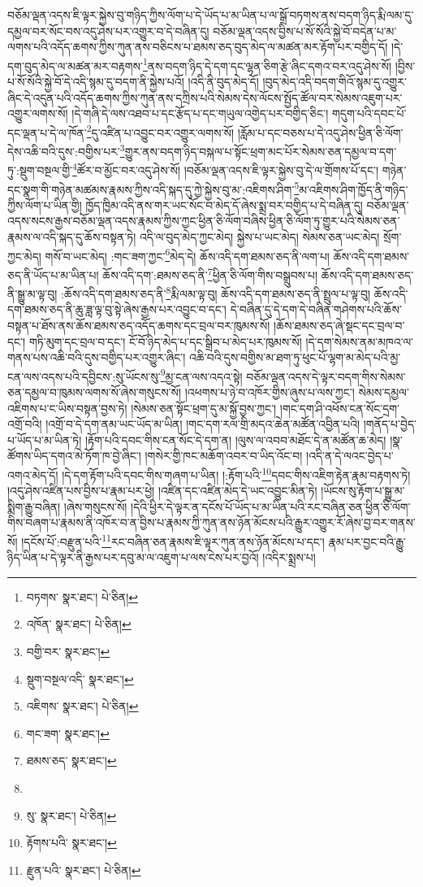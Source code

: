 བཅོམ་ལྡན་འདས་ཇི་ལྟར་སྐྱེས་བུ་གཉིད་ཀྱིས་ལོག་པ་དེ་ཡོད་པ་མ་ཡིན་པ་ལ་སྒྲོ་བཏགས་ནས་བདག་ཉིད་རྨི་ལམ་དུ་དམྱལ་བར་སོང་བས་འདུ་ཤེས་པར་འགྱུར་བ་དེ་བཞིན་དུ། བཅོམ་ལྡན་འདས་བྱིས་པ་སོ་སོའི་སྐྱེ་བོ་བདེན་པ་མ་ལགས་པའི་འདོད་ཆགས་ཀྱིས་ཀུན་ནས་བཅིངས་པ་ཐམས་ཅད་བུད་མེད་ལ་མཚན་མར་རྟོག་པར་བགྱིད་དོ། །དེ་དག་བུད་མེད་ལ་མཚན་མར་བརྟགས་\footnote{བཏགས་  སྣར་ཐང་།  པེ་ཅིན། }ནས་བདག་ཉིད་དེ་དག་དང་ལྷན་ཅིག་རྩེ་ཞིང་དགའ་བར་འདུ་ཤེས་སོ། །བྱིས་པ་སོ་སོའི་སྐྱེ་བོ་དེ་འདི་སྙམ་དུ་བདག་ནི་སྐྱེས་པའོ། །འདི་ནི་བུད་མེད་དོ། །བུད་མེད་འདི་བདག་གིའོ་སྙམ་དུ་འགྱུར་ཞིང་དེ་འདུན་པའི་འདོད་ཆགས་ཀྱིས་ཀུན་ནས་དཀྲིས་པའི་སེམས་དེས་ལོངས་སྤྱོད་ཚོལ་བར་སེམས་འཇུག་པར་འགྱུར་ལགས་སོ། །དེ་གཞི་དེ་ལས་འཐབ་པ་དང་རྩོད་པ་དང་གཡུལ་འགྱེད་པར་བགྱིད་ཅིང་། གདུག་པའི་དབང་པོ་དང་ལྡན་པ་དེ་ལ་ཁོན་\footnote{འཁོན་  སྣར་ཐང་།  པེ་ཅིན། }དུ་འཛིན་པ་འབྱུང་བར་འགྱུར་ལགས་སོ། །རློམ་པ་དང་བཅས་པ་དེ་འདུ་ཤེས་ཕྱིན་ཅི་ལོག་དེས་འཆི་བའི་དུས་:བགྱིས་པར་\footnote{བགྱི་བར་  སྣར་ཐང་། }གྱུར་ནས་བདག་ཉིད་བསྐལ་པ་སྟོང་ཕྲག་མང་པོར་སེམས་ཅན་དམྱལ་བ་དག་ཏུ་:སྡུག་བསྔལ་གྱི་\footnote{སྡུག་བསྔལ་འདི་  སྣར་ཐང་། }ཚོར་བ་མྱོང་བར་འདུ་ཤེས་སོ། །བཅོམ་ལྡན་འདས་ཇི་ལྟར་སྐྱེས་བུ་དེ་ལ་གྲོགས་པོ་དང་། གཉེན་དང་སྣག་གི་གཉེན་མཚམས་རྣམས་ཀྱིས་འདི་སྐད་དུ་ཀྱེ་སྐྱེས་བུ་མ་:འཇིགས་ཤིག་\footnote{འཇིགས་  སྣར་ཐང་།  པེ་ཅིན། }མ་འཇིགས་ཤིག་ཁྱོད་ནི་གཉིད་ཀྱིས་ལོག་པ་ཡིན་གྱི། ཁྱོད་ཁྱིམ་འདི་ནས་གར་ཡང་སོང་བ་མེད་དོ་ཞེས་སྨྲ་བར་བགྱིད་པ་དེ་བཞིན་དུ། བཅོམ་ལྡན་འདས་སངས་རྒྱས་བཅོམ་ལྡན་འདས་རྣམས་ཀྱིས་ཀྱང་ཕྱིན་ཅི་ལོག་བཞིས་ཕྱིན་ཅི་ལོག་ཏུ་གྱུར་པའི་སེམས་ཅན་རྣམས་ལ་འདི་སྐད་དུ་ཆོས་བསྟན་ཏེ། འདི་ལ་བུད་མེད་ཀྱང་མེད། སྐྱེས་པ་ཡང་མེད། སེམས་ཅན་ཡང་མེད། སྲོག་ཀྱང་མེད། གསོ་བ་ཡང་མེད། :གང་ཟག་ཀྱང་\footnote{གང་ཟག་  སྣར་ཐང་། }མེད་དེ། ཆོས་འདི་དག་ཐམས་ཅད་ནི་ལག་པ། ཆོས་འདི་དག་ཐམས་ཅད་ནི་ཡོད་པ་མ་ཡིན་པ། ཆོས་འདི་དག་:ཐམས་ཅད་ནི་\footnote{ཐམས་ཅད་  སྣར་ཐང་། }ཕྱིན་ཅི་ལོག་གིས་བསྒྲུབས་པ། ཆོས་འདི་དག་ཐམས་ཅད་ནི་སྒྱུ་མ་ལྟ་བུ། :ཆོས་འདི་དག་ཐམས་ཅད་ནི་\footnote{}རྨི་ལམ་ལྟ་བུ། ཆོས་འདི་དག་ཐམས་ཅད་ནི་སྤྲུལ་པ་ལྟ་བུ། ཆོས་འདི་དག་ཐམས་ཅད་ནི་ཆུ་ཟླ་ལྟ་བུ་སྟེ་ཞེས་རྒྱས་པར་འབྱུང་བ་དང་། དེ་བཞིན་དུ་དེ་དག་དེ་བཞིན་གཤེགས་པའི་ཆོས་བསྟན་པ་ཐོས་ནས་ཆོས་ཐམས་ཅད་འདོད་ཆགས་དང་བྲལ་བར་ཁུམས་སོ། །ཆོས་ཐམས་ཅད་ཞེ་སྡང་དང་བྲལ་བ་དང་། གཏི་མུག་དང་བྲལ་བ་དང་། ངོ་བོ་ཉིད་མེད་པ་དང་སྒྲིབ་པ་མེད་པར་ཁུམས་སོ། །དེ་དག་སེམས་ནམ་མཁའ་ལ་གནས་པས་འཆི་བའི་དུས་བགྱིད་པར་འགྱུར་ཞིང་། འཆི་བའི་དུས་བགྱིས་མ་ཐག་ཏུ་ཕུང་པོ་ལྷག་མ་མེད་པའི་མྱ་ངན་ལས་འདས་པའི་དབྱིངས་:སུ་ཡོངས་སུ་\footnote{སུ་  སྣར་ཐང་།  པེ་ཅིན། }མྱ་ངན་ལས་འདའ་སྟེ། བཅོམ་ལྡན་འདས་དེ་ལྟར་བདག་གིས་སེམས་ཅན་དམྱལ་བ་ཁུམས་ལགས་སོ་ཞེས་གསུངས་སོ། །འཕགས་པ་ཉེ་བ་འཁོར་གྱིས་ཞུས་པ་ལས་ཀྱང་། སེམས་དམྱལ་འཇིགས་པ་ང་ཡིས་བསྟན་བྱས་ཏེ། །སེམས་ཅན་སྟོང་ཕྲག་དུ་མ་སྐྱོ་བྱས་ཀྱང་། །གང་དག་ཤི་འཕོས་ངན་སོང་དྲག་འགྲོ་བའི། །འགྲོ་བ་དེ་དག་ནམ་ཡང་ཡོད་མ་ཡིན། །གང་དག་རལ་གྲི་མདའ་ཆེན་མཚོན་འབྱིན་པའི། །གནོད་པ་བྱེད་པ་ཡོད་པ་མ་ཡིན་ཏེ། །རྟོག་པའི་དབང་གིས་ངན་སོང་དེ་དག་ན། །ལུས་ལ་འབབ་མཐོང་དེ་ན་མཚོན་ཆ་མེད། །སྣ་ཚོགས་ཡིད་དགའ་མེ་ཏོག་ཁ་བྱེ་ཞིང་། །གསེར་གྱི་ཁང་མཆོག་འབར་བ་ཡིད་འོང་བ། །འདི་ན་དེ་ལའང་བྱེད་པ་འགའ་མེད་དོ། །དེ་དག་རྟོག་པའི་དབང་གིས་གཞག་པ་ཡིན། །:རྟོག་པའི་\footnote{རྟོགས་པའི་  སྣར་ཐང་། }དབང་གིས་འཇིག་རྟེན་རྣམ་བརྟགས་ཏེ། །འདུ་ཤེས་འཛིན་པས་བྱིས་པ་རྣམ་པར་ཕྱེ། །འཛིན་དང་འཛིན་མེད་དེ་ཡང་འབྱུང་མིན་ཏེ། །ཡོངས་སུ་རྟོག་པ་སྒྱུ་མ་སྨིག་རྒྱུ་བཞིན། །ཞེས་གསུངས་སོ། །དེའི་ཕྱིར་དེ་ལྟར་ན་དངོས་པོ་ཡོད་པ་མ་ཡིན་པའི་རང་བཞིན་ཅན་ཕྱིན་ཅི་ལོག་གིས་བཞག་པ་རྣམས་ནི་འཁོར་བ་ན་བྱིས་པ་རྣམས་ཀྱི་ཀུན་ནས་ཉོན་མོངས་པའི་རྒྱུར་འགྱུར་རོ་ཞེས་བྱ་བར་གནས་སོ། །དངོས་པོ་:བརྫུན་པའི་\footnote{རྫུན་པའི་  སྣར་ཐང་།  པེ་ཅིན། }རང་བཞིན་ཅན་རྣམས་ཇི་ལྟར་ཀུན་ནས་ཉོན་མོངས་པ་དང་། རྣམ་པར་བྱང་བའི་རྒྱུ་ཉིད་ཡིན་པ་དེ་ལྟར་ནི་རྒྱས་པར་དབུ་མ་ལ་འཇུག་པ་ལས་ངེས་པར་བྱའོ། །འདིར་སྨྲས་པ། 